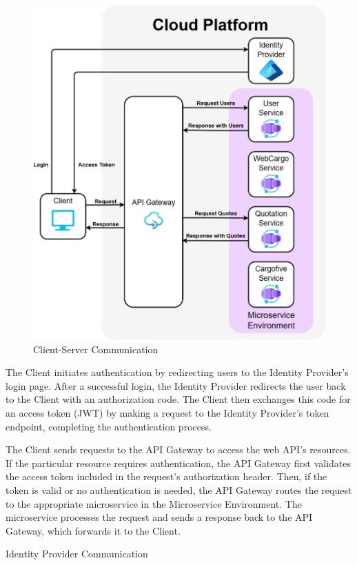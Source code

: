 \documentclass[12pt, reqno]{amsbook}
\makeatletter
\def\subsection{\@startsection{subsection}{2}%
      \z@{.5\linespacing\@plus.7\linespacing}{.25\linespacing}%
      {\normalfont\bfseries\flushleft}}
\theoremstyle{definition}
\theoremstyle{definition}
\numberwithin{section}{chapter}
\numberwithin{table}{chapter}
\numberwithin{figure}{chapter}
\makeatother
\begin{document}
\begin{figure}[H]
  \centering
  \includegraphics[width=0.9\linewidth]{images/ClientServerCommunication.png}
  \caption{\label{Figure:ClientServerCommunication}Client-Server Communication}
\end{figure}

The Client initiates authentication by redirecting users to the Identity Provider's login page. After a successful login, the Identity Provider redirects the user back to the Client with an authorization code. The Client then exchanges this code for an access token (\ac{JWT}) by making a request to the Identity Provider's token endpoint, completing the authentication process.

The Client sends requests to the \ac{API} Gateway to access the web \ac{API}'s resources. If the particular resource requires authentication, the \ac{API} Gateway first validates the access token included in the request's authorization header. Then, if the token is valid or no authentication is needed, the \ac{API} Gateway routes the request to the appropriate microservice in the Microservice Environment. The microservice processes the request and sends a response back to the \ac{API} Gateway, which forwards it to the Client.

\subsection{Identity Provider Communication}
\end{document}
